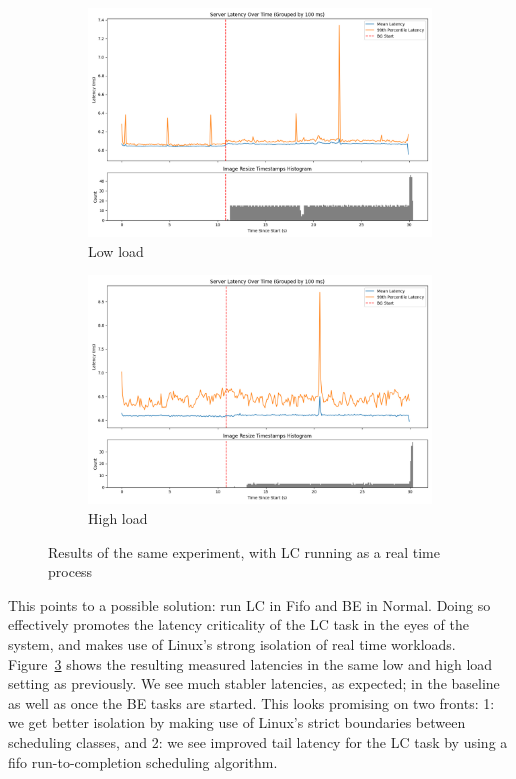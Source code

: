 \begin{figure}[t]
    \centering
    \begin{subfigure}[t]{0.48\textwidth}
        \includegraphics[width=\textwidth]{graphs/unedited-rt-low-two.png}
        \caption{Low load}\label{fig:unedited-rt-low-two}
    \end{subfigure}
    \hspace{\fill}
    \begin{subfigure}[t]{0.48\textwidth}
        \includegraphics[width=\textwidth]{graphs/unedited-rt-high-two.png}
        \caption{High load}\label{fig:unedited-rt-high-two}
    \end{subfigure}
    \caption{Results of the same experiment, with LC running as a real time process}\label{fig:unedited-rt}
\end{figure}

This points to a possible solution: run LC in Fifo and BE in Normal. Doing so
effectively promotes the latency criticality of the LC task in the eyes of the
system, and makes use of Linux's strong isolation of real time workloads.
Figure~\ref{fig:unedited-rt} shows the resulting measured latencies in the same
low and high load setting as previously. We see much stabler latencies, as
expected; in the baseline as well as once the BE tasks are started. This looks
promising on two fronts: 1: we get better isolation by making use of Linux's
strict boundaries between scheduling classes, and 2: we see improved tail
latency for the LC task by using a fifo run-to-completion scheduling algorithm.

